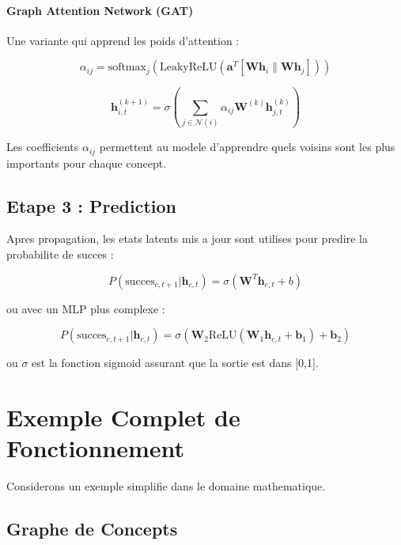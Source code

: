\documentclass[11pt, a4paper]{article}
\begin{document}
\paragraph{Graph Attention Network (GAT)}

Une variante qui apprend les poids d'attention :

\begin{equation}
    \alpha_{ij} = \text{softmax}_j\left(\text{LeakyReLU}(\mathbf{a}^T[\mathbf{W}\mathbf{h}_i \| \mathbf{W}\mathbf{h}_j])\right)
\end{equation}

\begin{equation}
    \mathbf{h}_{i,t}^{(k+1)} = \sigma\left(\sum_{j \in \mathcal{N}(i)} \alpha_{ij} \mathbf{W}^{(k)} \mathbf{h}_{j,t}^{(k)}\right)
\end{equation}

Les coefficients $\alpha_{ij}$ permettent au modele d'apprendre quels voisins sont les plus importants pour chaque concept.

\subsection{Etape 3 : Prediction}

Apres propagation, les etats latents mis a jour sont utilises pour predire la probabilite de succes :

\begin{equation}
    P(\text{succes}_{c,t+1} | \mathbf{h}_{c,t}) = \sigma(\mathbf{W}^T \mathbf{h}_{c,t} + b)
\end{equation}

ou avec un MLP plus complexe :

\begin{equation}
    P(\text{succes}_{c,t+1} | \mathbf{h}_{c,t}) = \sigma(\mathbf{W}_2 \text{ReLU}(\mathbf{W}_1 \mathbf{h}_{c,t} + \mathbf{b}_1) + \mathbf{b}_2)
\end{equation}

ou $\sigma$ est la fonction sigmoid assurant que la sortie est dans [0,1].

\section{Exemple Complet de Fonctionnement}

Considerons un exemple simplifie dans le domaine mathematique.

\subsection{Graphe de Concepts}
\end{document}
